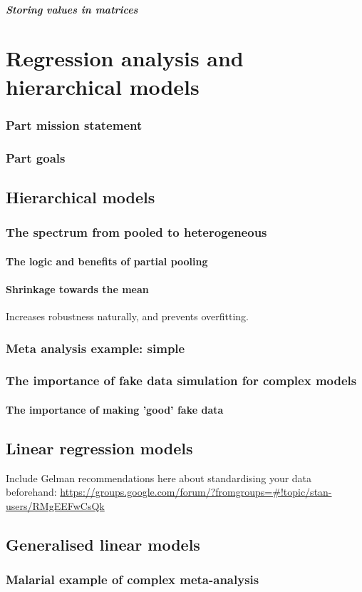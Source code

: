 \documentclass[11pt,fullpage]{book}
\begin{document}
\subsubsection{Storing values in matrices}


\part{Regression analysis and hierarchical models}\label{part:regressionHierarchical}
\section{Part mission statement}
\section{Part goals}

\chapter{Hierarchical models}\label{chap:hierarchicalModels}
\section{The spectrum from pooled to heterogeneous}
\subsection{The logic and benefits of partial pooling}
\subsection{Shrinkage towards the mean}
Increases robustness naturally, and prevents overfitting.

\section{Meta analysis example: simple}

\section{The importance of fake data simulation for complex models}
\subsection{The importance of making 'good' fake data}

\chapter{Linear regression models}
Include Gelman recommendations here about standardising your data beforehand: \url{https://groups.google.com/forum/?fromgroups=#!topic/stan-users/RMgEEFwCsQk}

\chapter{Generalised linear models}
\section{Malarial example of complex meta-analysis}




\end{document}
